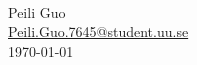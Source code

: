 \documentclass[12pt]{article}
\begin{document}
\begin{titlepage}
\HRule \\[0.4cm]

 

{\huge Peili Guo\\} %
{\large \href{mailto:Peili.Guo.7645@student.uu.se}{Peili.Guo.7645@student.uu.se}}
\\[2cm] %


{\Large \today}\\[2cm] %



\vfill %

\end{titlepage}

\newpage
\end{document}
